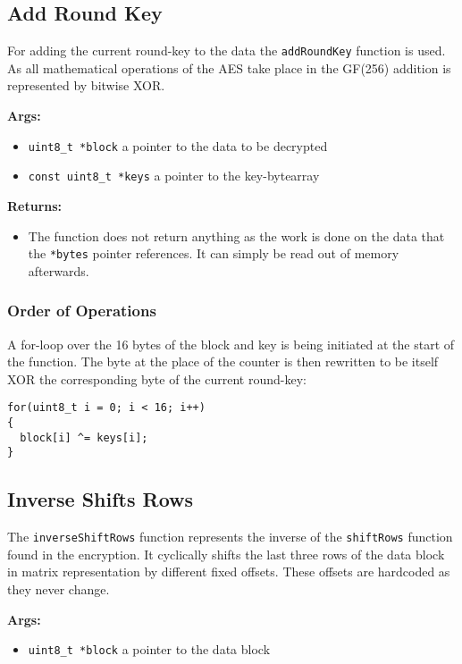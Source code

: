 \subsection{Add Round Key}
\label{ch:dec_addroundkey}
For adding the current round-key to the data the \lstinline{addRoundKey} function is used. As all mathematical operations of the AES take place in the GF(256) addition is represented by bitwise XOR.

\textbf{Args:}
\begin{itemize}
  \item \lstinline{uint8_t *block} a pointer to the data to be decrypted
  \item \lstinline{const uint8_t *keys} a pointer to the key-bytearray
\end{itemize}

\textbf{Returns:}
\begin{itemize}
  \item The function does not return anything as the work is done on the data that the \lstinline{*bytes} pointer references. It can simply be read out of memory afterwards.
\end{itemize}

\subsubsection{Order of Operations}
A for-loop over the 16 bytes of the block and key is being initiated at the start of the function. The byte at the place of the counter is then rewritten to be itself XOR the corresponding byte of the current round-key:

\begin{lstlisting}
for(uint8_t i = 0; i < 16; i++)
{
  block[i] ^= keys[i];
}
\end{lstlisting}


\subsection{Inverse Shifts Rows}
\label{ch:dec_inverseshiftrows}

The \lstinline{inverseShiftRows} function represents the inverse of the \lstinline{shiftRows} function found in the encryption. It cyclically shifts the last three rows of the data block in matrix representation by different fixed offsets. These offsets are hardcoded as they never change.

\textbf{Args:}
\begin{itemize}
  \item \lstinline{uint8_t *block} a pointer to the data block
\end{itemize}

